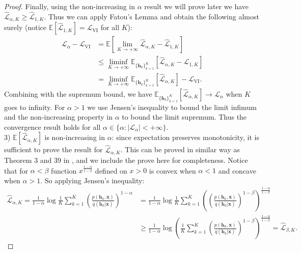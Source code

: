 \begin{proof}
Finally, using the non-increasing in $\alpha$ result we will prove later we have $\hat{\mathcal{L}}_{\alpha, K} \geq \hat{\mathcal{L}}_{1, K}$. Thus we can apply Fatou's Lemma and obtain the following almost surely (notice $\mathbb{E}[\hat{\mathcal{L}}_{1, K}] = \mathcal{L}_{\text{VI}}$ for all $K$):
%
\begin{equation*}
\begin{aligned}
\mathcal{L}_{\alpha} - \mathcal{L}_{\text{VI}} &= \mathbb{E}[ \lim_{K \rightarrow +\infty} \hat{\mathcal{L}}_{\alpha, K} - \hat{\mathcal{L}}_{1, K}] \\
&\leq \liminf_{K \rightarrow +\infty} \mathbb{E}_{\{ \bm{h}_k \}_{k=1}^K }[\hat{\mathcal{L}}_{\alpha, K} - \hat{\mathcal{L}}_{1, K}] \\
&= \liminf_{K \rightarrow +\infty} \mathbb{E}_{\{ \bm{h}_k \}_{k=1}^K }[\hat{\mathcal{L}}_{\alpha, K}] - \mathcal{L}_{\text{VI}}.
\end{aligned}
\end{equation*}
%
Combining with the supremum bound, we have $\mathbb{E}_{\{ \bm{h}_k \}_{k=1}^K }[\hat{\mathcal{L}}_{\alpha, K}] \rightarrow \mathcal{L}_{\alpha}$ when $K$ goes to infinity. For $\alpha > 1$ we use Jensen's inequality to bound the limit infimum and the non-increasing property in $\alpha$ to bound the limit supremum. Thus the convergence result holds for all $\alpha \in \{\alpha: |\mathcal{L}_{\alpha}| < +\infty \}$.\\
%

3) $\mathbb{E}[\hat{\mathcal{L}}_{\alpha, K}]$ is non-increasing in $\alpha$: since expectation preserves monotonicity, it is sufficient to prove the result for $\hat{\mathcal{L}}_{\alpha, K}$. This can be proved in similar way as Theorem 3 and 39 in \cite{van_erven:renyi2014}, and we include the prove here for completeness. Notice that for $\alpha < \beta$ function $x^{\frac{1 - \alpha}{1 - \beta}}$ defined on $x > 0$ is convex when $\alpha < 1$ and concave when $\alpha > 1$. So applying Jensen's inequality:
\begin{equation*}
\begin{aligned}
\hat{\mathcal{L}}_{\alpha, K} = \frac{1}{1 - \alpha} \log \frac{1}{K} \sum_{k=1}^K \left( \frac{p(\bm{h}_k, \bm{x})}{q(\bm{h}_k|\bm{x})}  \right)^{1 - \alpha} 
&= \frac{1}{1 - \alpha} \log \frac{1}{K} \sum_{k=1}^K \left( \left( \frac{p(\bm{h}_k, \bm{x})}{q(\bm{h}_k|\bm{x})}  \right)^{1 - \beta} \right)^{\frac{1 - \alpha}{1 - \beta}} \\
&\geq \frac{1}{1 - \alpha} \log \left( \frac{1}{K} \sum_{k=1}^K \left( \frac{p(\bm{h}_k, \bm{x})}{q(\bm{h}_k|\bm{x})}  \right)^{1 - \beta} \right)^{\frac{1 - \alpha}{1 - \beta}} = \hat{\mathcal{L}}_{\beta, K}.
\end{aligned}
\end{equation*}


\end{proof}

